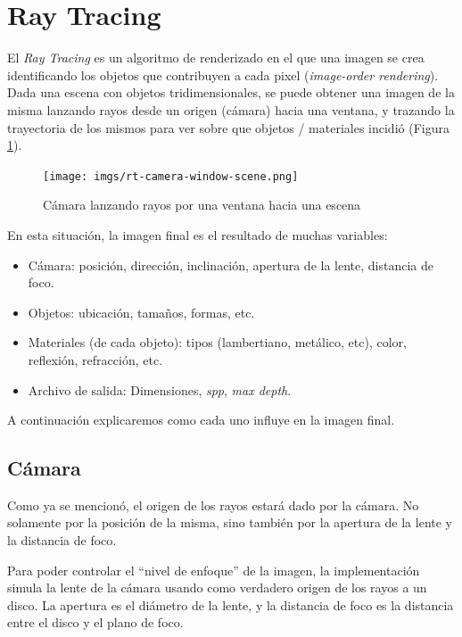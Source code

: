 \section{Ray Tracing} \label{sec:ray-tracing}

El \textit{Ray Tracing} es un algoritmo de renderizado en el que una imagen se
crea identificando los objetos que contribuyen a cada pixel (\textit{image-order
rendering}). Dada una escena con objetos tridimensionales, se puede obtener una
imagen de la misma lanzando rayos desde un origen (cámara) hacia una ventana, y
trazando la trayectoria de los mismos para ver sobre que objetos / materiales
incidió (Figura \ref{fig:rt-camera-window-scene}).

\begin{figure}[H]
    \centering
    \texttt{[image: imgs/rt-camera-window-scene.png]}
    \caption{Cámara lanzando rayos por una ventana hacia una escena}
    \label{fig:rt-camera-window-scene}
\end{figure}

En esta situación, la imagen final es el resultado de muchas variables:

\begin{itemize}
    \item Cámara: posición, dirección, inclinación, apertura de la lente,
        distancia de foco.
    \item Objetos: ubicación, tamaños, formas, etc.
    \item Materiales (de cada objeto): tipos (lambertiano, metálico, etc),
    color, reflexión, refracción, etc.
    \item Archivo de salida: Dimensiones, \textit{spp}, \textit{max depth}.
\end{itemize}

A continuación explicaremos como cada uno influye en la imagen final.

\subsection{Cámara} \label{ssec:rt-camera}

Como ya se mencionó, el origen de los rayos estará dado por la cámara. No
solamente por la posición de la misma, sino también por la apertura de la lente
y la distancia de foco.

Para poder controlar el ``nivel de enfoque'' de la imagen, la implementación
simula la lente de la cámara usando como verdadero origen de los rayos a un
disco. La apertura es el diámetro de la lente, y la distancia de foco
es la distancia entre el disco y el plano de foco.


